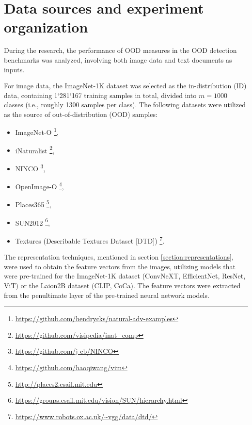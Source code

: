 \section{Data sources and experiment organization}
\label{section:real-organization}

During the research, the performance of OOD measures in the OOD detection benchmarks was analyzed, involving both image data and text documents as inputs.

For image data, the ImageNet-1K \cite{Deng-2009} dataset was selected as the in-distribution (ID) data, containing 1`281`167 training samples in total, divided into $m = 1000$ classes (i.e., roughly 1300 samples per class). The following datasets were utilized as the source of out-of-distribution (OOD) samples:
\vspace{-0.5\baselineskip}
\begin{itemize}
    \item ImageNet-O \cite{Hendrycks-2021-adv}\footnote{\url{https://github.com/hendrycks/natural-adv-examples}},
    \item iNaturalist \cite{VanHorn-2018}\footnote{\url{https://github.com/visipedia/inat_comp}},
    \item NINCO \cite{Bitterwolf-2023}\footnote{\url{https://github.com/j-cb/NINCO}},
    \item OpenImage-O \cite{Wang-2022}\footnote{\url{https://github.com/haoqiwang/vim}},
    \item Places365 \cite{Zhou-2017}\footnote{\url{http://places2.csail.mit.edu}},
    \item SUN2012 \cite{Xiao-2010}\footnote{\url{https://groups.csail.mit.edu/vision/SUN/hierarchy.html}},
    \item Textures (Describable Textures Dataset [DTD]) \cite{Cimpoi-2013}\footnote{\url{https://www.robots.ox.ac.uk/~vgg/data/dtd/}}.
\end{itemize}

The representation techniques, mentioned in section \ref{section:representations}, were used to obtain the feature vectors from the images, utilizing models that were pre-trained for the ImageNet-1K dataset (ConvNeXT, EfficientNet, ResNet, ViT) or the Laion2B dataset \cite{Ilharco-2021} (CLIP, CoCa). The feature vectors were extracted from the penultimate layer of the pre-trained neural network models.

